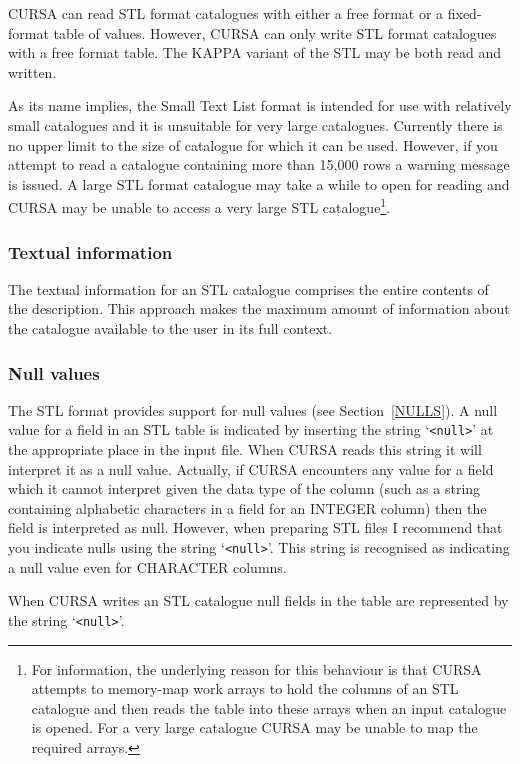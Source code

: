 \documentclass[twoside,11pt]{article}
\renewcommand{\_}{\texttt{\symbol{95}}}
\begin{document}
CURSA can read STL format catalogues with either a free format or a
fixed-format table of values.  However, CURSA can only write STL format
catalogues with a free format table.  The KAPPA variant of the STL may be
both read and written.

As its name implies, the Small Text List format is intended for use
with relatively small catalogues and it is unsuitable for very large
catalogues.  Currently there is no upper limit to the size of catalogue
for which it can be used.  However, if you attempt to read a catalogue
containing more than 15,000 rows a warning message is issued.  A large STL
format catalogue may take a while to open for reading and CURSA may be
unable to access a very large STL catalogue\footnote{For
information, the underlying reason for this behaviour is that CURSA
attempts to memory-map work arrays to hold the columns of an STL
catalogue and then reads the table into these arrays when an input
catalogue is opened.  For a very large catalogue CURSA may be unable to
map the required arrays.}.

\subsubsection{Textual information}

The textual information for an STL catalogue comprises the entire contents
of the description. This approach makes the maximum amount of information
about the catalogue available to the user in its full context.

\subsubsection{\label{STLNULL}Null values}

The STL format provides support for null values (see Section~\ref{NULLS}).
A null value for a field in an STL table is indicated by inserting
the string `\verb-<null>-' at the appropriate place in the input file.
When CURSA reads this string it will interpret it as a null value.
Actually, if CURSA encounters any value for a field which it cannot
interpret given the data type of the column (such as a string containing
alphabetic characters in a field for an INTEGER column) then the field
is interpreted as null.  However, when preparing STL files I recommend
that you indicate nulls using the string `\verb-<null>-'.  This string
is recognised as indicating a null value even for CHARACTER columns.

When CURSA writes an STL catalogue null fields in the table are
represented by the string `\verb-<null>-'.
\end{document}
